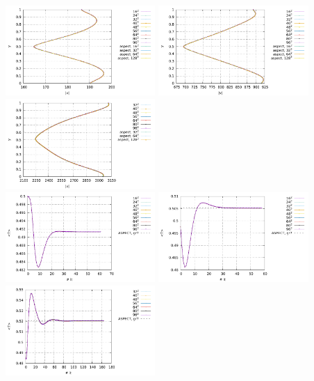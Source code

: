 \begin{center}
\includegraphics[width=5.7cm]{python_codes/fieldstone_110/results_EBA/vel_profile_Ra1e4.pdf}
\includegraphics[width=5.7cm]{python_codes/fieldstone_110/results_EBA/vel_profile_Ra1e5.pdf}
\includegraphics[width=5.7cm]{python_codes/fieldstone_110/results_EBA/vel_profile_Ra1e6.pdf}\\
\includegraphics[width=5.7cm]{python_codes/fieldstone_110/results_EBA/T_avrg_Ra1e4.pdf}
\includegraphics[width=5.7cm]{python_codes/fieldstone_110/results_EBA/T_avrg_Ra1e5.pdf}
\includegraphics[width=5.7cm]{python_codes/fieldstone_110/results_EBA/T_avrg_Ra1e6.pdf}\\

\end{center}
